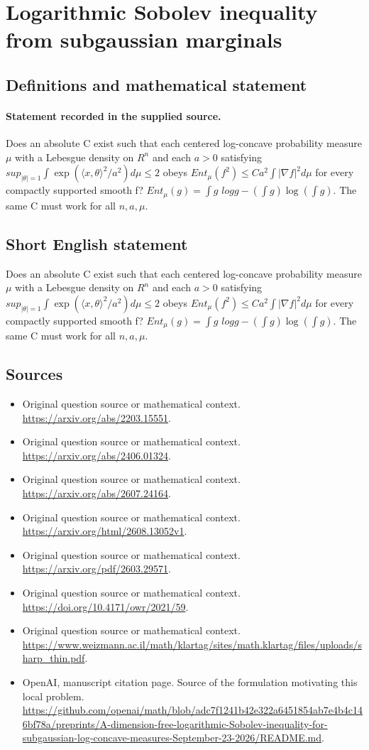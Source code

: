 \documentclass[11pt]{article}
\begin{document}
\section*{Logarithmic Sobolev inequality from subgaussian marginals}\label{statement}
\subsection{Definitions and mathematical statement}
\paragraph{Statement recorded in the supplied source.}
Does an absolute C exist such that each centered log-concave probability measure $\mu $ with a Lebesgue density on $R^{n}$ and each $a>0$ satisfying $sup_{|\theta |=1}\int \exp (\langle x,\theta \rangle ^{2}/a^{2})d\mu \leq 2$ obeys $Ent_\mu (f^{2})\leq Ca^{2}\int |\nabla f|^{2}d\mu $ for every compactly supported smooth f? $Ent_\mu (g)=\int g$ $logg-(\int g)\log (\int g)$. The same C must work for all $n,a,\mu $.
\subsection{Short English statement}
Does an absolute C exist such that each centered log-concave probability measure $\mu $ with a Lebesgue density on $R^{n}$ and each $a>0$ satisfying $sup_{|\theta |=1}\int \exp (\langle x,\theta \rangle ^{2}/a^{2})d\mu \leq 2$ obeys $Ent_\mu (f^{2})\leq Ca^{2}\int |\nabla f|^{2}d\mu $ for every compactly supported smooth f? $Ent_\mu (g)=\int g$ $logg-(\int g)\log (\int g)$. The same C must work for all $n,a,\mu $.
\subsection{Sources}
\begin{itemize}
\item[S1] Original question source or mathematical context.
\url{https://arxiv.org/abs/2203.15551}.
\item[S2] Original question source or mathematical context.
\url{https://arxiv.org/abs/2406.01324}.
\item[S3] Original question source or mathematical context.
\url{https://arxiv.org/abs/2607.24164}.
\item[S4] Original question source or mathematical context.
\url{https://arxiv.org/html/2608.13052v1}.
\item[S5] Original question source or mathematical context.
\url{https://arxiv.org/pdf/2603.29571}.
\item[S6] Original question source or mathematical context.
\url{https://doi.org/10.4171/owr/2021/59}.
\item[S7] Original question source or mathematical context.
\url{https://www.weizmann.ac.il/math/klartag/sites/math.klartag/files/uploads/sharp_thin.pdf}.
\item[S8] OpenAI, manuscript citation page. Source of the formulation motivating this local problem.
\url{https://github.com/openai/math/blob/adc7f1241b42e322a6451854ab7e4b4c146bf78a/preprints/A-dimension-free-logarithmic-Sobolev-inequality-for-subgaussian-log-concave-measures-September-23-2026/README.md}.
\end{itemize}
\end{document}
